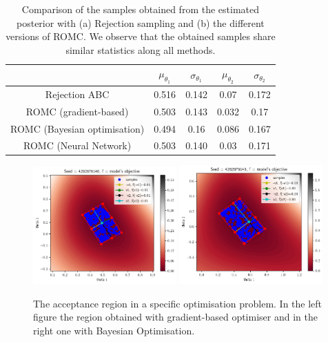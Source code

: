 \begin{table}
\begin{center}
\begin{tabular}{ c|c|c|c|c }
\hline
& \(\mu_{\theta_1}\) & \(\sigma_{\theta_1}\) & \(\mu_{\theta_2}\) & \(\sigma_{\theta_2}\) \\
\hline \hline
Rejection ABC & 0.516 & 0.142 & 0.07 & 0.172 \\
\hline
ROMC (gradient-based) & 0.503 & 0.143 & 0.032 & 0.17 \\
\hline
ROMC (Bayesian optimisation) & 0.494 & 0.16 & 0.086 & 0.167 \\
\hline
ROMC (Neural Network) & 0.503 & 0.140 & 0.03 & 0.171 \\
\hline
\end{tabular}
\end{center}
\caption{Comparison of the samples obtained from the estimated
  posterior with (a) Rejection sampling and (b) the different versions
  of ROMC. We observe that the obtained samples share similar
  statistics along all methods. \label{tab:ma2}}
\end{table}

\begin{figure}[ht]
    \begin{center}
        \includegraphics[width=0.49\textwidth]{./latex_files/images/chapter4/ma2_region_1.png}
        \includegraphics[width=0.49\textwidth]{./latex_files/images/chapter4/ma2_region_1_bo.png}
    \end{center}
  \caption[The acceptance region of a specific deterministic simulator.]{The acceptance region in a specific optimisation problem. In the left figure the region obtained with gradient-based optimiser and in the right one with Bayesian Optimisation.}
  \label{fig:ma2_5}
\end{figure}


